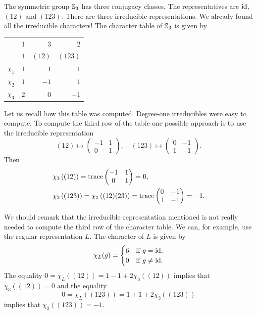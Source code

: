\begin{example}
	The symmetric group $\mathbb{S}_3$ has three conjugacy classes. The representatives are 
	$\operatorname{id}$, $(12)$ and $(123)$. There are three irreducible representations. We already found all the irreducible characters! 
	The character table of $\mathbb{S}_3$ is given by 
	\begin{center}
		\begin{tabular}{|c|rrr|}
			\hline
			& $1$ & $3$ & $2$\tabularnewline
			& $1$ & $(12)$ & $(123)$ \tabularnewline
			\hline 
			$\chi_{1}$ & $1$ & $1$ & $1$\tabularnewline
			$\chi_{2}$ & $1$ & $-1$ & $1$ \tabularnewline
			$\chi_{3}$ & $2$ & $0$ & $-1$ \tabularnewline
			\hline
		\end{tabular}
	\end{center}
	Let us recall how this table was computed. Degree-one irreducibles were easy to compute. 
	To compute the third row of the table one possible approach is to use
	the irreducible representation  
	\[
	(12)\mapsto \begin{pmatrix}-1&1\\0&1\end{pmatrix},
	\quad
	(123)\mapsto \begin{pmatrix}0&-1\\1&-1\end{pmatrix}.
	\]
    Then	
    \begin{align*}
		&\chi_3\left( (12) \right)=\operatorname{trace}\begin{pmatrix}-1&1\\0&1\end{pmatrix}=0,\\
		&\chi_3\left( (123) \right)=\chi_3\left( (12)(23)\right)=\operatorname{trace}\begin{pmatrix}0&-1\\1&-1\end{pmatrix}=-1.
	\end{align*}

	We should remark that the irreducible representation mentioned is not really needed to
	compute the third row of the character table. We can, for example, use the regular
	representation $L$. The character of $L$ is given by 
	\[
		\chi_L(g)=\begin{cases}
			6 & \text{if $g=\operatorname{id}$},\\
			0 & \text{if $g\ne\operatorname{id}$}.
		\end{cases}
	\]
	The equality $0=\chi_L\left( (12) \right)=1-1+2\chi_3( (12))$ implies that 
	$\chi_3( (12))=0$ and the equality 
    \[ 
    0=\chi_L( (123))=1+1+2\chi_3( (123))
    \]
	implies that $\chi_3\left( (123) \right)=-1$. 


\end{example}
